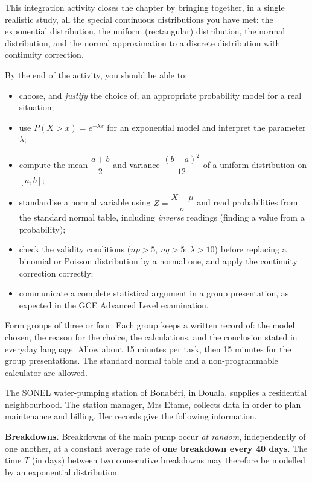 \documentclass[11pt]{article}
\newcommand{\cle}[1]{{\popxbold\color{popdark}#1}}
\newcounter{popsec}
\newcounter{popsub}
\newcommand{\courssub}[1]{%
  \stepcounter{popsub}%
  \par\vspace{9pt}\noindent{\popxbold\fontsize{11.5}{13}\selectfont\color{popink}{\color{poporange}\thepopsec.\thepopsub}\hspace{6pt}#1}\par\nopagebreak\vspace{4pt}
}
\begin{document}
This integration activity closes the chapter by bringing together, in a single realistic study, all the special continuous distributions you have met: the \cle{exponential distribution}, the \cle{uniform (rectangular) distribution}, the \cle{normal distribution}, and the \cle{normal approximation} to a discrete distribution with \cle{continuity correction}.

By the end of the activity, you should be able to:

\begin{itemize}
\item choose, and \emph{justify} the choice of, an appropriate probability model for a real situation;
\item use $P(X>x)=e^{-\lambda x}$ for an exponential model and interpret the parameter $\lambda$;
\item compute the mean $\dfrac{a+b}{2}$ and variance $\dfrac{(b-a)^2}{12}$ of a uniform distribution on $[a,b]$;
\item standardise a normal variable using $Z=\dfrac{X-\mu}{\sigma}$ and read probabilities from the standard normal table, including \emph{inverse} readings (finding a value from a probability);
\item check the validity conditions ($np>5$, $nq>5$; $\lambda>10$) before replacing a binomial or Poisson distribution by a normal one, and apply the continuity correction correctly;
\item communicate a complete statistical argument in a group presentation, as expected in the GCE Advanced Level examination.
\end{itemize}

\begin{methode}
Form groups of three or four. Each group keeps a written record of: the model chosen, the reason for the choice, the calculations, and the conclusion stated in everyday language. Allow about 15 minutes per task, then 15 minutes for the group presentations. The standard normal table and a non-programmable calculator are allowed.
\end{methode}

\courssub{Situation}

The \cle{SONEL} water-pumping station of Bonabéri, in Douala, supplies a residential neighbourhood. The station manager, Mrs Etame, collects data in order to plan maintenance and billing. Her records give the following information.

\textbf{Breakdowns.} Breakdowns of the main pump occur \emph{at random}, independently of one another, at a constant average rate of \textbf{one breakdown every 40 days}. The time $T$ (in days) between two consecutive breakdowns may therefore be modelled by an exponential distribution.
\end{document}
